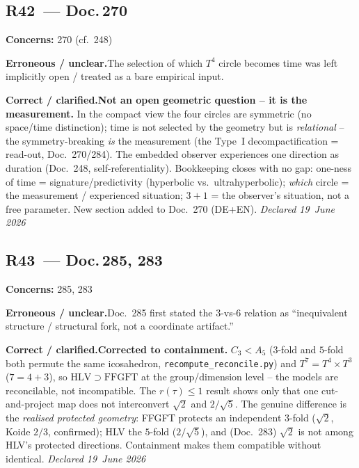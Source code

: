 \medskip


\subsection*{R42~--- Doc.\,270}

\noindent\textbf{Concerns:} 270 (cf.\ 248)


\smallskip\noindent\textbf{Erroneous / unclear.}\quad The selection of which $T^4$ circle becomes time was left implicitly open / treated as a bare empirical input.


\smallskip\noindent\textbf{Correct / clarified.}\quad \textbf{Not an open geometric question -- it is the measurement.} In the compact view the four circles are symmetric (no space/time distinction); time is not selected by the geometry but is \emph{relational} -- the symmetry-breaking \emph{is} the measurement (the Type~I decompactification = read-out, Doc.~270/284). The embedded observer experiences one direction as duration (Doc.~248, self-referentiality). Bookkeeping closes with no gap: one-ness of time = signature/predictivity (hyperbolic vs.\ ultrahyperbolic); \emph{which} circle = the measurement / experienced situation; $3{+}1$ = the observer's situation, not a free parameter. New section added to Doc.~270 (DE+EN). \emph{Declared 19~June 2026}


\medskip


\subsection*{R43~--- Doc.\,285, 283}

\noindent\textbf{Concerns:} 285, 283


\smallskip\noindent\textbf{Erroneous / unclear.}\quad Doc.~285 first stated the $3$-vs-$6$ relation as ``inequivalent structure / structural fork, not a coordinate artifact.''


\smallskip\noindent\textbf{Correct / clarified.}\quad \textbf{Corrected to containment.} $C_3<A_5$ ($3$-fold and $5$-fold both permute the same icosahedron, \texttt{recompute\_reconcile.py}) and $T^7=T^4\times T^3$ ($7=4+3$), so $\mathrm{HLV}\supset\mathrm{FFGFT}$ at the group/dimension level -- the models are reconcilable, not incompatible. The $r(\tau)\le1$ result shows only that one cut-and-project map does not interconvert $\sqrt2$ and $2/\sqrt5$. The genuine difference is the \emph{realised protected geometry}: FFGFT protects an independent $3$-fold ($\sqrt2$, Koide $2/3$, confirmed); HLV the $5$-fold ($2/\sqrt5$), and (Doc.~283) $\sqrt2$ is not among HLV's protected directions. Containment makes them compatible without identical. \emph{Declared 19~June 2026}


